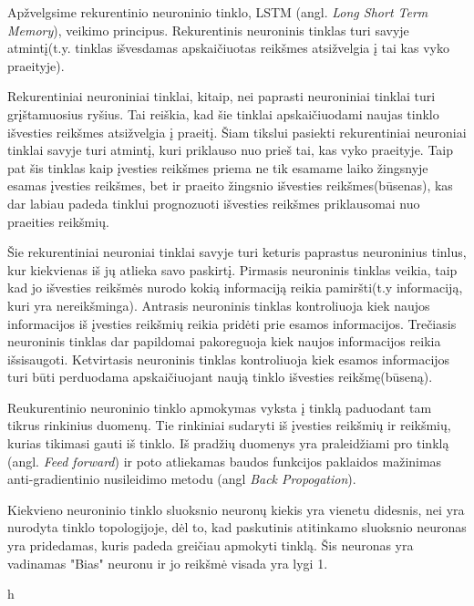 Apžvelgsime rekurentinio neuroninio tinklo, LSTM (angl. \textit{Long Short Term Memory}), veikimo principus.
Rekurentinis neuroninis tinklas turi savyje atmintį(t.y. tinklas išvesdamas apskaičiuotas reikšmes atsižvelgia į tai kas vyko praeityje).

Rekurentiniai neuroniniai tinklai, kitaip, nei paprasti neuroniniai tinklai turi grįštamuosius ryšius. Tai reiškia, kad šie tinklai apskaičiuodami naujas tinklo išvesties reikšmes atsižvelgia į praeitį. Šiam tikslui pasiekti rekurentiniai neuroniai tinklai savyje turi atmintį, kuri priklauso nuo prieš tai, kas vyko praeityje. Taip pat šis tinklas kaip įvesties reikšmes priema ne tik esamame laiko žingsnyje esamas įvesties reikšmes, bet ir praeito žingsnio išvesties reikšmes(būsenas), kas dar labiau padeda tinklui prognozuoti išvesties reikšmes priklausomai nuo praeities reikšmių.

Šie rekurentiniai neuroniai tinklai savyje turi keturis paprastus neuroninius tinlus, kur kiekvienas iš jų atlieka savo paskirtį. Pirmasis neuroninis tinklas veikia, taip kad jo išvesties reikšmės nurodo kokią informaciją reikia pamiršti(t.y informaciją, kuri yra nereikšminga). Antrasis neuroninis tinklas kontroliuoja kiek naujos informacijos iš įvesties reikšmių reikia pridėti prie esamos informacijos. Trečiasis neuroninis tinklas dar papildomai pakoreguoja kiek naujos informacijos reikia išsisaugoti. Ketvirtasis neuroninis tinklas kontroliuoja kiek esamos informacijos turi būti perduodama apskaičiuojant naują tinklo išvesties reikšmę(būseną).

Reukurentinio neuroninio tinklo apmokymas vyksta į tinklą paduodant tam tikrus rinkinius duomenų. Tie rinkiniai sudaryti iš įvesties reikšmių ir reikšmių, kurias tikimasi gauti iš tinklo. Iš pradžių duomenys yra praleidžiami pro tinklą (angl. \textit{Feed forward}) ir poto atliekamas baudos funkcijos paklaidos mažinimas anti-gradientinio nusileidimo metodu (angl \textit{Back Propogation}).

Kiekvieno neuroninio tinklo sluoksnio neuronų kiekis yra vienetu didesnis, nei yra nurodyta tinklo topologijoje, dėl to, kad paskutinis atitinkamo sluoksnio neuronas yra pridedamas, kuris padeda greičiau apmokyti tinklą. Šis neuronas yra vadinamas "Bias" neuronu ir jo reikšmė visada yra lygi 1.

h


